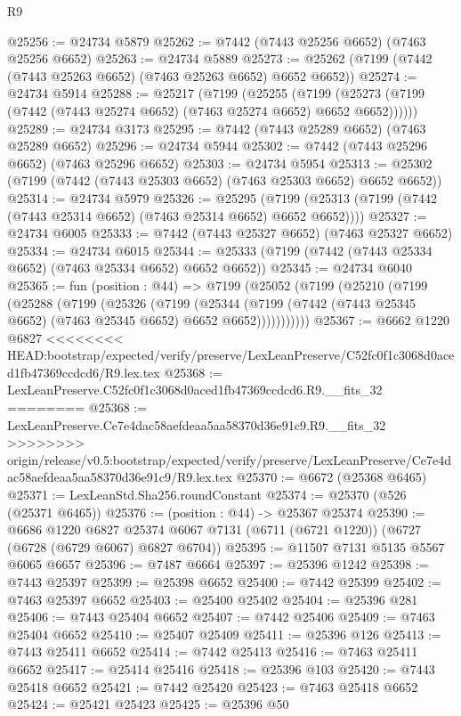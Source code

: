 \begin{lexlean}{R9}
\begin{coremodule}
{{{{{{{{{{{{{{{{{{{{{{{{{{{{{{{{{{{{{{{{{{{{{{{{{{{{{{{{{{{{{{{{{{{{{{{{{{{{{{{{{{{{@25256 := @24734 @5879
@25262 := @7442 (@7443 @25256 @6652) (@7463 @25256 @6652)
@25263 := @24734 @5889
@25273 := @25262 (@7199 (@7442 (@7443 @25263 @6652) (@7463 @25263 @6652) @6652 @6652))
@25274 := @24734 @5914
@25288 := @25217
    (@7199
      (@25255
        (@7199 (@25273 (@7199 (@7442 (@7443 @25274 @6652) (@7463 @25274 @6652) @6652 @6652))))))
@25289 := @24734 @3173
@25295 := @7442 (@7443 @25289 @6652) (@7463 @25289 @6652)
@25296 := @24734 @5944
@25302 := @7442 (@7443 @25296 @6652) (@7463 @25296 @6652)
@25303 := @24734 @5954
@25313 := @25302 (@7199 (@7442 (@7443 @25303 @6652) (@7463 @25303 @6652) @6652 @6652))
@25314 := @24734 @5979
@25326 := @25295
    (@7199 (@25313 (@7199 (@7442 (@7443 @25314 @6652) (@7463 @25314 @6652) @6652 @6652))))
@25327 := @24734 @6005
@25333 := @7442 (@7443 @25327 @6652) (@7463 @25327 @6652)
@25334 := @24734 @6015
@25344 := @25333 (@7199 (@7442 (@7443 @25334 @6652) (@7463 @25334 @6652) @6652 @6652))
@25345 := @24734 @6040
@25365 := fun (position : @44) =>
  @7199
    (@25052
      (@7199
        (@25210
          (@7199
            (@25288
              (@7199
                (@25326
                  (@7199
                    (@25344
                      (@7199 (@7442 (@7443 @25345 @6652) (@7463 @25345 @6652) @6652 @6652)))))))))))
@25367 := @6662 @1220 @6827
<<<<<<<< HEAD:bootstrap/expected/verify/preserve/LexLeanPreserve/C52fc0f1c3068d0aced1fb47369ccdcd6/R9.lex.tex
@25368 := LexLeanPreserve.C52fc0f1c3068d0aced1fb47369ccdcd6.R9.__fits_32
========
@25368 := LexLeanPreserve.Ce7e4dac58aefdeaa5aa58370d36e91c9.R9.__fits_32
>>>>>>>> origin/release/v0.5:bootstrap/expected/verify/preserve/LexLeanPreserve/Ce7e4dac58aefdeaa5aa58370d36e91c9/R9.lex.tex
@25370 := @6672 (@25368 @6465)
@25371 := LexLeanStd.Sha256.roundConstant
@25374 := @25370 (@526 (@25371 @6465))
@25376 := (position : @44) -> @25367 @25374
@25390 := @6686
    @1220
    @6827
    @25374
    @6067
    @7131
    (@6711 (@6721 @1220))
    (@6727 (@6728 (@6729 @6067) @6827 @6704))
@25395 := @11507 @7131 @5135 @5567 @6065 @6657
@25396 := @7487 @6664
@25397 := @25396 @1242
@25398 := @7443 @25397
@25399 := @25398 @6652
@25400 := @7442 @25399
@25402 := @7463 @25397 @6652
@25403 := @25400 @25402
@25404 := @25396 @281
@25406 := @7443 @25404 @6652
@25407 := @7442 @25406
@25409 := @7463 @25404 @6652
@25410 := @25407 @25409
@25411 := @25396 @126
@25413 := @7443 @25411 @6652
@25414 := @7442 @25413
@25416 := @7463 @25411 @6652
@25417 := @25414 @25416
@25418 := @25396 @103
@25420 := @7443 @25418 @6652
@25421 := @7442 @25420
@25423 := @7463 @25418 @6652
@25424 := @25421 @25423
@25425 := @25396 @50
}}}}}}}}}}}}}}}}}}}}}}}}}}}}}}}}}}}}}}}}}}}}}}}}}}}}}}}}}}}}}}}}}}}}}}}}}}}}}}}}}}}}
\end{coremodule}
\end{lexlean}
